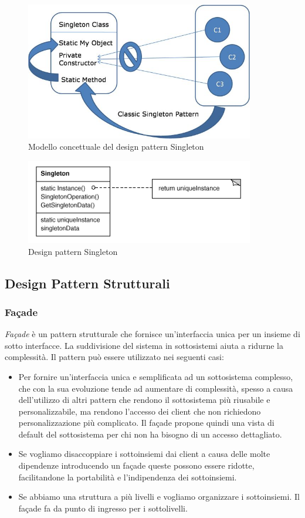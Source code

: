 \begin{figure}[H]
	\centering
	\includegraphics[width=10cm]{diagrammi_img/singleton.jpg}
	\caption{Modello concettuale del design pattern Singleton}
\end{figure}

\begin{figure}[H]
	\centering
	\includegraphics[width=10cm]{diagrammi_img/singleton_class.png}
	\caption{Design pattern Singleton}
\end{figure}

\subsection{Design Pattern Strutturali}

\subsubsection{Fa\c{c}ade}
\textit{Fa\c{c}ade} è un pattern strutturale che fornisce un'interfaccia unica per un insieme di sotto interfacce. La suddivisione del sistema in sottosistemi aiuta a ridurne la complessità.
Il pattern può essere utilizzato nei seguenti casi:
\begin{itemize}
	\item Per fornire un'interfaccia unica e semplificata ad un sottosistema complesso, che con la sua evoluzione tende ad aumentare di complessità, spesso a causa dell'utilizzo di altri pattern che rendono il sottosistema più riusabile e personalizzabile, ma rendono l'accesso dei client che non richiedono personalizzazione più complicato. Il fa\c{c}ade propone quindi una vista di default del sottosistema per chi non ha bisogno di un accesso dettagliato.
	\item Se vogliamo disaccoppiare i sottoinsiemi dai client a causa delle molte dipendenze introducendo un fa\c{c}ade queste possono essere ridotte, facilitandone la portabilità e l'indipendenza dei sottoinsiemi.
	\item Se abbiamo una struttura a più livelli e vogliamo organizzare i sottoinsiemi. Il fa\c{c}ade fa da punto di ingresso per i sottolivelli.
\end{itemize}

